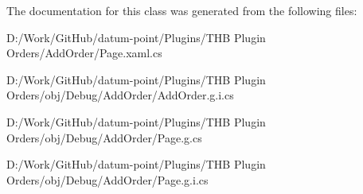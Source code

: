 The documentation for this class was generated from the following files\+:\begin{DoxyCompactItemize}
\item 
D\+:/\+Work/\+Git\+Hub/datum-\/point/\+Plugins/\+T\+H\+B Plugin Orders/\+Add\+Order/Page.\+xaml.\+cs\item 
D\+:/\+Work/\+Git\+Hub/datum-\/point/\+Plugins/\+T\+H\+B Plugin Orders/obj/\+Debug/\+Add\+Order/Add\+Order.\+g.\+i.\+cs\item 
D\+:/\+Work/\+Git\+Hub/datum-\/point/\+Plugins/\+T\+H\+B Plugin Orders/obj/\+Debug/\+Add\+Order/Page.\+g.\+cs\item 
D\+:/\+Work/\+Git\+Hub/datum-\/point/\+Plugins/\+T\+H\+B Plugin Orders/obj/\+Debug/\+Add\+Order/Page.\+g.\+i.\+cs\end{DoxyCompactItemize}
